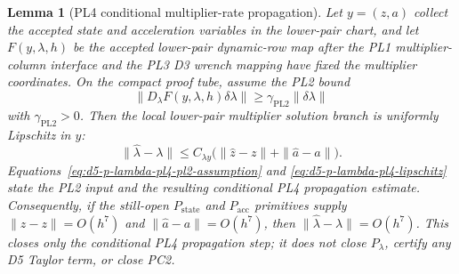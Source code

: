 \documentclass[preprint,12pt]{elsarticle}
\newtheorem{lemma}{Lemma}
\begin{document}
\begin{lemma}[PL4 conditional multiplier-rate propagation]
\label{lem:d5-p-lambda-pl4-rate-propagation}
Let \(y=(z,a)\) collect the accepted state and acceleration variables in the
lower-pair chart, and let \(F(y,\lambda,h)\) be the accepted lower-pair
dynamic-row map after the PL1 multiplier-column interface and the PL3 D3
wrench mapping have fixed the multiplier coordinates.  On the compact proof
tube, assume the PL2 bound
\begin{equation}
\label{eq:d5-p-lambda-pl4-pl2-assumption}
  \|D_{\lambda}F(y,\lambda,h)\delta\lambda\|
  \ge \gamma_{\mathrm{PL2}}\|\delta\lambda\|
\end{equation}
with \(\gamma_{\mathrm{PL2}}>0\).  Then the local lower-pair multiplier
solution branch is uniformly Lipschitz in \(y\):
\begin{equation}
\label{eq:d5-p-lambda-pl4-lipschitz}
  \|\widehat\lambda-\lambda\| \le C_{\lambda y}
     \bigl(\|\widehat z-z\|+\|\widehat a-a\|\bigr).
\end{equation}
Equations~\eqref{eq:d5-p-lambda-pl4-pl2-assumption} and
\eqref{eq:d5-p-lambda-pl4-lipschitz} state the PL2 input and the resulting
conditional PL4 propagation estimate.
Consequently, if the still-open \(P_{\mathrm{state}}\) and
\(P_{\mathrm{acc}}\) primitives supply
\(\|\widehat z-z\|=O(h^7)\) and
\(\|\widehat a-a\|=O(h^7)\), then
\(\|\widehat\lambda-\lambda\|=O(h^7)\).  This closes only the conditional PL4
propagation step; it does not close \(P_{\lambda}\), certify any D5 Taylor
term, or close PC2.
\end{lemma}
\end{document}
